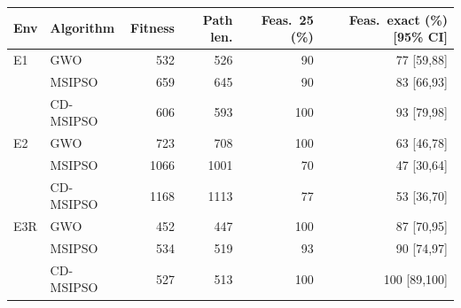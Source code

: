 \begin{tabular}{llrrrr}
\toprule
Env & Algorithm & Fitness & Path len. & Feas.\ 25 (\%) & Feas.\ exact (\%) [95\% CI]\\
\midrule
E1 & GWO & 532 & 526 & 90 & 77 [59,88]\\
 & MSIPSO & 659 & 645 & 90 & 83 [66,93]\\
 & CD-MSIPSO & 606 & 593 & 100 & 93 [79,98]\\
\midrule
E2 & GWO & 723 & 708 & 100 & 63 [46,78]\\
 & MSIPSO & 1066 & 1001 & 70 & 47 [30,64]\\
 & CD-MSIPSO & 1168 & 1113 & 77 & 53 [36,70]\\
\midrule
E3R & GWO & 452 & 447 & 100 & 87 [70,95]\\
 & MSIPSO & 534 & 519 & 93 & 90 [74,97]\\
 & CD-MSIPSO & 527 & 513 & 100 & 100 [89,100]\\
\bottomrule
\end{tabular}